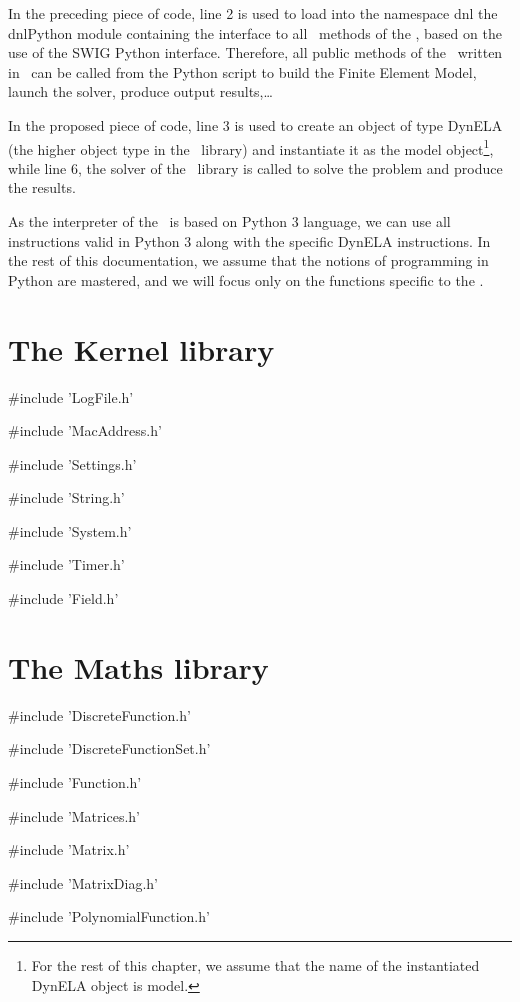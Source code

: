 In the preceding piece of code, line 2 is used to load into the namespace \textsf{dnl} the \textsf{dnlPython} module containing the interface to all \Cpp~methods of the \DynELA, based on the use of the SWIG Python interface. Therefore, all public methods of the \DynELA~written in \Cpp~can be called from the Python script to build the Finite Element Model, launch the solver, produce output results,\ldots

In the proposed piece of code, line 3 is used to create an object of type \textsf{DynELA} (the higher object type in the \DynELA~library) and instantiate it as the \textsf{model} object\footnote{For the rest of this chapter, we assume that the name of the instantiated \textsf{DynELA} object is \textsf{model.}}, while line 6, the solver of the \DynELA~library is called to solve the problem and produce the results.

As the interpreter of the \DynELA~is based on Python 3 language, we can use all instructions valid in Python 3 along with the specific DynELA instructions. In the rest of this documentation, we assume that the notions of programming in Python are mastered, and we will focus only on the functions specific to the \DynELA.

\section{The Kernel library}

\#include 'LogFile.h'

\#include 'MacAddress.h'

\#include 'Settings.h'

\#include 'String.h'

\#include 'System.h'

\#include 'Timer.h'

\#include 'Field.h'

\section{The Maths library}

\#include 'DiscreteFunction.h'

\#include 'DiscreteFunctionSet.h'

\#include 'Function.h'

\#include 'Matrices.h'

\#include 'Matrix.h'

\#include 'MatrixDiag.h'

\#include 'PolynomialFunction.h'

